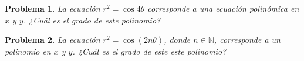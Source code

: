 \documentclass[letterpaper,12pt]{article}
\newtheorem{prob}{Problema}
\begin{document}
\begin{prob}
La ecuación $r^2=\cos{4\theta}$ corresponde a una ecuación polinómica en $x$ y $y$. ¿Cuál es el grado de este polinomio?
\end{prob}

\begin{prob}
La ecuación $r^2=\cos(2n\theta)$, donde $n\in \mathbb{N}$, corresponde a un polinomio en $x$ y $y$. ¿Cuál es el grado de este este polinomio?
\end{prob}
\end{document}
